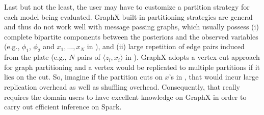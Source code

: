 Last but not the least, the user may have to customize a partition strategy for
each model being evaluated. 
GraphX built-in partitioning strategies are general and thus do not work well with message passing graphs,
which usually 
possess (i) complete bipartite components between the posteriors and the  observed variables
(e.g., $\phi_1$, $\phi_2$ and $x_1, \ldots, x_N$ in ), and
(ii) large repetition of edge pairs induced from the plate (e.g.,  $N$ pairs of $\langle z_i, x_i\rangle$ in ).
GraphX adopts a vertex-cut approach for graph partitioning
and a vertex would be replicated to multiple partitions if it lies on the cut.
So, imagine if the partition cuts on $x$'s in , 
that would incur large replication overhead as well as shuffling overhead.
Consequently, that really requires the domain users 
to have excellent knowledge on GraphX in order to carry out efficient inference on Spark. 


%
%




